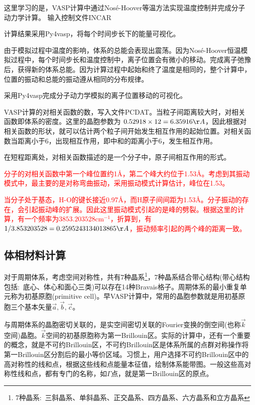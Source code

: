 这里学习的是，\textrm{VASP}计算中通过\textrm{Nos\'e-Hoover}等温方法实现温度控制并完成分子动力学计算。
输入控制文件\textrm{INCAR}

计算结果采用\textrm{Py4vasp}，将每个时间步长下的能量可视化。

由于模拟过程中温度的影响，体系的总能会表现出震荡。因为\textrm{Nos\'e-Hoover}恒温模拟过程中，每个时间步长和温度控制中，离子位置会有微小的移动。完成离子弛豫后，获得新的体系总能。因为计算过程中起始和终了温度是相同的，整个计算中，位置的振动和总能的振动遵从相同的分布规律。

采用\textrm{Py4vasp}完成分子动力学模拟的离子位置移动的可视化。

\textrm{VASP}计算的对相关函数的数，写入文件\textrm{PCDAT}。当粒子间距离较大时，对相关函数即体系的密度。这里的晶胞参数为
$0.52918\times12=6.35916\AA$，因此根据对相关函数的形状，就可以估计两个粒子间开始发生相互作用的起始位置。对相关函数当距离小于6，出现相互作用，即中和的距离小于6，发生相互作用。

在短程距离处，对相关函数描述的是一个分子中，原子间相互作用的形式。

\textcolor{red}{分子的对相关函数中第一个峰位置约1\AA，第二个峰大约位于1.53\AA。考虑到其振动模式中，最主要的是对称弯曲振动，采用振动模式计算估计，峰位在1.53。}

\textcolor{red}{当分子处于基态，\textrm{H-O}的键长接近0.97\AA，而H原子间间距为1.53\AA。分子振动的存在，会引起振动峰的扩展。因此这里振动模式引起的是峰的劈裂。根据这里的计算，有一个频率为$3853.203528\mathrm{cm}^{-1}$，折算到，有$1/3.853203528=0.2595243134013865\AA$，振动频率引起的两个峰的距离一致。}

\subsection{体相材料计算}\label{Sec:bulk}
对于周期体系，考虑空间对称性，共有7种晶系\footnote{7种晶系:~三斜晶系、单斜晶系、正交晶系、四方晶系、六方晶系和立方晶系}，7种晶系结合带心结构(带心结构包括:~底心、体心和面心三类)可以存在14种\textrm{Bravais}格子。周期体系的最小重复单元称为初基原胞\textrm{(primitive cell)}。早\textrm{VASP}计算中，常用的晶胞参数就是用初基原胞三个基本矢量$\vec a,\vec b,\vec c$。

与周期体系的晶胞密切关联的，是实空间密切关联的\textrm{Fourier}变换的倒空间(也称$\vec k$空间)晶胞。$\vec k$空间的初基原胞称为第一\textrm{Brillouin}区。实际的计算中，还有一个重要的概念，就是不可约\textrm{Brillouin}区，不可约\textrm{Brillouin}区是体系所属的点群对称操作将第一\textrm{Brillouin}区分割后的最小等价区域。习惯上，用户选择不可约\textrm{Brillouin}区中的高对称性的线和点，根据这些线和点能量本征值，绘制体系能带图。一般这些高对称性线和点，都有专门的名称，如$\Gamma$点，就是第一\textrm{Brillouin}区的原点。

